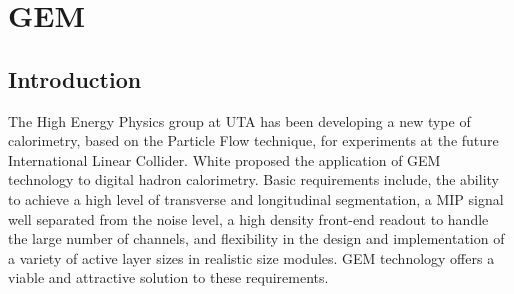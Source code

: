 \section{GEM}
\subsection{Introduction}
The High Energy Physics group at UTA has been developing a new type of calorimetry, based on the Particle Flow technique, for experiments at the future International Linear Collider. White proposed the application of GEM~\cite{Sauli1997531} technology to digital hadron calorimetry. Basic requirements include, the ability to achieve a high level of transverse and longitudinal segmentation, a MIP signal well separated from the noise level, a high density front-end readout to handle the large number of channels, and flexibility in the design and implementation of a variety of active layer sizes in realistic size modules. GEM technology offers a viable and attractive solution to these requirements.
